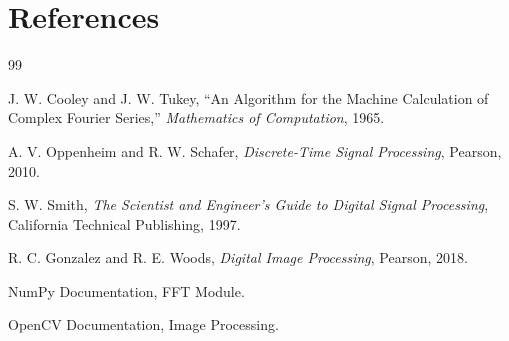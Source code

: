 \documentclass{zc-ust-hw}
\begin{document}
\section{References}
\begin{thebibliography}{99}

J. W. Cooley and J. W. Tukey,
``An Algorithm for the Machine Calculation of Complex Fourier Series,''
\textit{Mathematics of Computation}, 1965.

A. V. Oppenheim and R. W. Schafer,
\textit{Discrete-Time Signal Processing},
Pearson, 2010.

S. W. Smith,
\textit{The Scientist and Engineer's Guide to Digital Signal Processing},
California Technical Publishing, 1997.

R. C. Gonzalez and R. E. Woods,
\textit{Digital Image Processing},
Pearson, 2018.

NumPy Documentation, FFT Module.

OpenCV Documentation, Image Processing.

\end{thebibliography}
\end{document}
